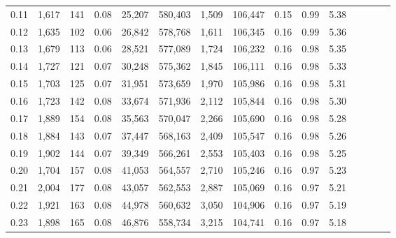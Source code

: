 \begin{tabular}{rrrcrrrrrrrrrrr}
0.11 &   1,617 &    141 &                                       0.08 &   25,207 &  580,403 &    1,509 &  106,447 &  0.15 &  0.99 &                         5.38 \\
0.12 &   1,635 &    102 &                                       0.06 &   26,842 &  578,768 &    1,611 &  106,345 &  0.16 &  0.99 &                         5.36 \\
0.13 &   1,679 &    113 &                                       0.06 &   28,521 &  577,089 &    1,724 &  106,232 &  0.16 &  0.98 &                         5.35 \\
0.14 &   1,727 &    121 &                                       0.07 &   30,248 &  575,362 &    1,845 &  106,111 &  0.16 &  0.98 &                         5.33 \\
0.15 &   1,703 &    125 &                                       0.07 &   31,951 &  573,659 &    1,970 &  105,986 &  0.16 &  0.98 &                         5.31 \\
0.16 &   1,723 &    142 &                                       0.08 &   33,674 &  571,936 &    2,112 &  105,844 &  0.16 &  0.98 &                         5.30 \\
0.17 &   1,889 &    154 &                                       0.08 &   35,563 &  570,047 &    2,266 &  105,690 &  0.16 &  0.98 &                         5.28 \\
0.18 &   1,884 &    143 &                                       0.07 &   37,447 &  568,163 &    2,409 &  105,547 &  0.16 &  0.98 &                         5.26 \\
0.19 &   1,902 &    144 &                                       0.07 &   39,349 &  566,261 &    2,553 &  105,403 &  0.16 &  0.98 &                         5.25 \\
0.20 &   1,704 &    157 &                                       0.08 &   41,053 &  564,557 &    2,710 &  105,246 &  0.16 &  0.97 &                         5.23 \\
0.21 &   2,004 &    177 &                                       0.08 &   43,057 &  562,553 &    2,887 &  105,069 &  0.16 &  0.97 &                         5.21 \\
0.22 &   1,921 &    163 &                                       0.08 &   44,978 &  560,632 &    3,050 &  104,906 &  0.16 &  0.97 &                         5.19 \\
0.23 &   1,898 &    165 &                                       0.08 &   46,876 &  558,734 &    3,215 &  104,741 &  0.16 &  0.97 &                         5.18 \\

\end{tabular}
